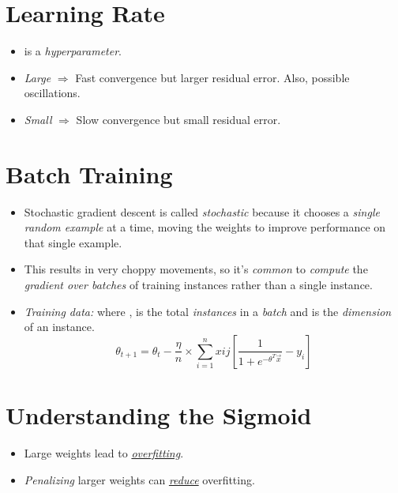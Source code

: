 \documentclass[
	number={4},
	title={Logistic Regression}
]{cs584notes}
\begin{document}
\section{Learning Rate}\label{sec:learning-rate}
\begin{itemize}
	\item \data{$\eta$} is a \emph{hyperparameter}.
	\item \emph{Large} \data{$\eta$} $\Rightarrow$ Fast convergence but larger residual error.
	Also, possible oscillations.
	\item \emph{Small} \data{$\eta$} $\Rightarrow$ Slow convergence but small residual error.
\end{itemize}


\section{Batch Training}\label{sec:batch-training}
\begin{itemize}
	\item Stochastic gradient descent is called \emph{stochastic} because it chooses a \emph{single random example} at a time, moving the weights to improve performance on that single example.
	\item This results in very choppy movements, so it's \emph{common} to \emph{compute} the \emph{gradient over batches} of training instances rather than a single instance.
	\item \emph{Training data: }  where ,  is the total \emph{instances} in a \emph{batch} and  is the \emph{dimension} of an instance.
	\begin{equation}
		\theta_{t+1} = \theta_{t} - \frac{\eta}{n} \times \sum_{i=1}^{n} xij \left[ \frac{1}{1 + e^{-\theta^{T}\vec{x}}} - y_{i} \right]
		\label{eq:batch-training}
	\end{equation}
\end{itemize}

\section{Understanding the Sigmoid}\label{sec:understanding-the-sigmoid}
\begin{itemize}
	\item Large weights lead to \hyperref[sec:fitting]{\emph{overfitting}}.
	\item \emph{Penalizing} larger weights can \hyperref[subsec:resolving-overfitting]{\emph{reduce}} overfitting.
\end{itemize}
\end{document}
